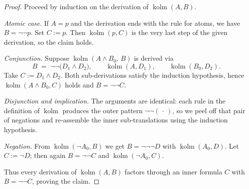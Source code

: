 \documentclass{article}
\begin{document}
    \begin{proof}
    Proceed by induction on the derivation of \(\operatorname{kolm}(A,B)\).
    
    \smallskip
    \emph{Atomic case.}  
    If \(A=p\) and the derivation ends with the rule for atoms, we have
    \(B=\neg\neg p\).  
    Set \(C:=p\).  
    Then \(\operatorname{kolm}(p,C)\) is the very last step of the given
    derivation, so the claim holds.
    
    \smallskip
    \emph{Conjunction.}  
    Suppose \(\operatorname{kolm}(A\land B_0,\,B)\) is derived via
    \[
       B \;=\; \neg\neg\bigl(D_1\land D_2\bigr),
       \qquad
       \operatorname{kolm}(A,D_1),
       \qquad
       \operatorname{kolm}(B_0,D_2).
    \]
    Take \(C := D_1\land D_2\).
    Both sub‑derivations satisfy the induction hypothesis, hence
    \(\operatorname{kolm}(A\land B_0,C)\) holds and
    \(B=\neg\neg C\).
    
    \smallskip
    \emph{Disjunction and implication.}  
    The arguments are identical: each rule in the definition of
    \(\operatorname{kolm}\) produces the outer pattern
    \(\neg\neg(\,\cdot\,)\), so we peel off that pair of negations and
    re‑assemble the inner sub‑translations using the induction hypothesis.
    
    \smallskip
    \emph{Negation.}  
    From \(\operatorname{kolm}(\neg A_0,B)\) we get
    \(B=\neg\neg\neg D\) with \(\operatorname{kolm}(A_0,D)\).
    Let \(C := \neg D\); then again \(B=\neg\neg C\) and
    \(\operatorname{kolm}(\neg A_0,C)\).
    
    \smallskip
    Thus every derivation of \(\operatorname{kolm}(A,B)\) factors through
    an inner formula \(C\) with \(B=\neg\neg C\), proving the claim.
    \end{proof}
\end{document}
